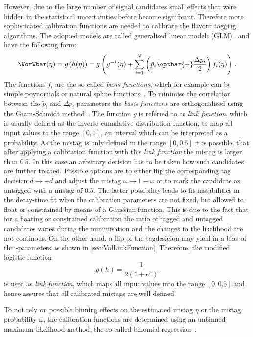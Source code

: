 However, due to the large number of \BdToDpi signal candidates small effects that were hidden in the statistical uncertainties before become significant.
Therefore more sophisticated calibration functions are needed to calibrate the flavour tagging algorithms.
The adopted models are called generalised linear models (GLM)~\cite{GLM} and have the following form:
\begin{equation}
\WorWbar(\eta) = g\left(h(\eta)\right) = g\left( g^{-1} (\eta) + \sum_{i=1}^{N} \left(\tilde{p}_i \kern 0.0em\optbar{\kern -0.0em +} \frac{\Delta p_i}{2}\right) f_i(\eta)\right)\,.
\end{equation}
The functions $f_i$ are the so-called \emph{basis functions}, which for example can be simple poynomials or natural spline functions~\cite{Nsplines}.
To minimise the correlation between the $\tilde{p}_i$ and $\Delta p_i$ parameters the \emph{basis functions} are orthogonalised using the Gram-Schmidt method~\cite{GramSchmidt}.
The function $g$ is referred to as \emph{link function}, which is usually defined as the inverse cumulative distribution function, to map all input values to the range $[0,1]$, \ie an interval which can be interpreted as a probability.
As the mistag is only defined in the range $[0, 0.5]$ it is possible, that after applying a calibration function with this \emph{link function} the mistag is larger than \num{0.5}.
In this case an arbitrary decision has to be taken how such candidates are further treated.
Possible options are to either flip the corresponding tag decision $d\to-d$ and adjust the mistag $\omega\to1-\omega$ or to mark the candidate as untagged with a mistag of \num{0.5}.
The latter possibility leads to fit instabilities in the decay-time fit when the calibration parameters are not fixed, but allowed to float or constrained by means of a Gaussian function.
This is due to the fact that for a floating or constrained calibration the ratio of tagged and untagged candidates varies during the minimisation and the changes to the likelihood are not continous.
On the other hand, a flip of the tagdesicion may yield in a bias of the \CP-parameters as shown in \cref{sec:ValLinkFunction}.
Therefore, the modified logistic function
\begin{equation}
g(h)=\frac{1}{2\left(1+e^h\right)}\label{eq:modlink}
\end{equation}
is used as \emph{link function}, which maps all input values into the range $[0, 0.5]$ and hence assures that all calibrated mistags are well defined.

To not rely on possible binning effects on the estimated mistag $\eta$ or the mistag probability $\omega$, the calibration functions are determined using an unbinned maximum-likelihood method, the so-called binomial regression~\cite{BinRegression}.

